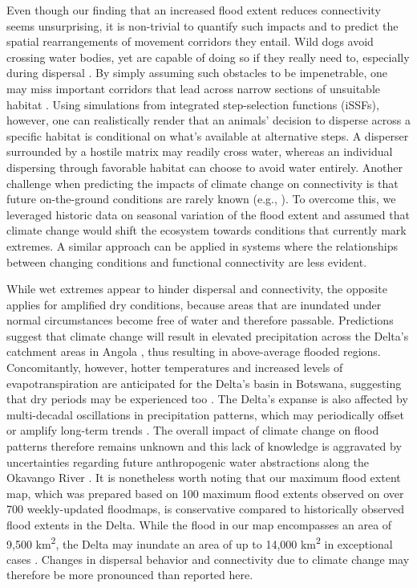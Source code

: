 \documentclass[abstract=on,10pt,a4paper,bibliography=totocnumbered]{article}
\begin{document}
Even though our finding that an increased flood extent reduces connectivity
seems unsurprising, it is non-trivial to quantify such impacts and to predict
the spatial rearrangements of movement corridors they entail. Wild dogs avoid
crossing water bodies, yet are capable of doing so if they really need to,
especially during dispersal \citep{McNutt.1996, Cozzi.2013, Cozzi.2020,
Hofmann.2023}. By simply assuming such obstacles to be impenetrable, one may
miss important corridors that lead across narrow sections of unsuitable habitat
\citep{Marrec.2020}. Using simulations from integrated step-selection functions
(iSSFs), however, one can realistically render that an animals' decision to
disperse across a specific habitat is conditional on what's available at
alternative steps. A disperser surrounded by a hostile matrix may readily cross
water, whereas an individual dispersing through favorable habitat can choose to
avoid water entirely. Another challenge when predicting the impacts of climate
change on connectivity is that future on-the-ground conditions are rarely known
(e.g., \citealp{Wolski.2008}). To overcome this, we leveraged historic data on
seasonal variation of the flood extent and assumed that climate change would
shift the ecosystem towards conditions that currently mark extremes. A similar
approach can be applied in systems where the relationships between changing
conditions and functional connectivity are less evident.

While wet extremes appear to hinder dispersal and connectivity, the opposite
applies for amplified dry conditions, because areas that are inundated under
normal circumstances become free of water and therefore passable. Predictions
suggest that climate change will result in elevated precipitation across the
Delta's catchment areas in Angola \citep{Wolski.2008, IPCC.2022}, thus resulting
in above-average flooded regions. Concomitantly, however, hotter temperatures
and increased levels of evapotranspiration are anticipated for the Delta's basin
in Botswana, suggesting that dry periods may be experienced too
\citep{Wolski.2008, Moses.2018, Akinyemi.2019, IPCC.2022}. The Delta's expanse
is also affected by multi-decadal oscillations in precipitation patterns, which
may periodically offset or amplify long-term trends \citep{Wolski.2012}. The
overall impact of climate change on flood patterns therefore remains unknown
\citep{Wolski.2008, Wolski.2012} and this lack of knowledge is aggravated by
uncertainties regarding future anthropogenic water abstractions along the
Okavango River \citep{Kgathi.2006, Murray-Hudson.2006, Hughes.2011}. It is
nonetheless worth noting that our maximum flood extent map, which was prepared
based on 100 maximum flood extents observed on over 700 weekly-updated
floodmaps, is conservative compared to historically observed flood extents in
the Delta. While the flood in our map encompasses an area of 9,500
km\textsuperscript{2}, the Delta may inundate an area of up to 14,000
km\textsuperscript{2} in exceptional cases \citep{McCarthy.2003,
Gumbricht.2004}. Changes in dispersal behavior and connectivity due to climate
change may therefore be more pronounced than reported here.
\end{document}
